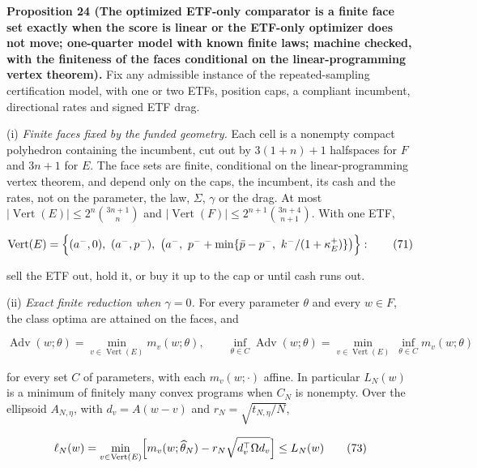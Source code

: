 \documentclass[11pt]{article}
\begin{document}
\label{res:Proposition-24}
\textbf{Proposition 24 (The optimized ETF-only comparator is a finite face set exactly when the score is linear or the ETF-only optimizer does not move; one-quarter model with known finite laws; machine checked, with the finiteness of the faces conditional on the linear-programming vertex theorem).}
Fix any admissible instance of the repeated-sampling certification
model, with one or two ETFs, position caps, a compliant incumbent,
directional rates and signed ETF drag.

(i) \emph{Finite faces fixed by the funded geometry.} Each cell is a
nonempty compact polyhedron containing the incumbent, cut out by
\(3(1+n)+1\) halfspaces for \(F\) and \(3n+1\) for \(E\). The face
sets are finite, conditional on the linear-programming vertex
theorem, and depend only on the caps, the incumbent, its cash
and the rates, not on the parameter, the law, \(\Sigma\), \(\gamma\)
or the drag. At most
\(|\operatorname{Vert}(E)|\leq2^n\binom{3n+1}{n}\) and
\(|\operatorname{Vert}(F)|\leq2^{n+1}\binom{3n+4}{n+1}\). With one
ETF,

\begin{equation*}
\operatorname{Vert}(E)=\Bigl\{(a^-,0),\ (a^-,p^-),\
\bigl(a^-,\ p^-+\min\{\bar p-p^-,\ k^-/(1+\kappa^+_E)\}\bigr)\Bigr\}:\tag{71}\label{eq:71}
\end{equation*}

sell the ETF out, hold it, or buy it up to the cap or until cash
runs out.

(ii) \emph{Exact finite reduction when \(\gamma=0\).} For every parameter
\(\theta\) and every \(w\in F\), the class optima are attained on the
faces, and

\begin{equation*}
\operatorname{Adv}(w;\theta)=\min_{v\in\operatorname{Vert}(E)}m_v(w;\theta),
\qquad
\inf_{\theta\in C}\operatorname{Adv}(w;\theta)
 =\min_{v\in\operatorname{Vert}(E)}\ \inf_{\theta\in C}m_v(w;\theta)\tag{72}\label{eq:72}
\end{equation*}

for every set \(C\) of parameters, with each \(m_v(w;\cdot)\) affine.
In particular \(L_N(w)\) is a minimum of finitely many convex
programs when \(C_N\) is nonempty. Over the ellipsoid \(A_{N,\eta}\),
with \(d_v=A(w-v)\) and \(r_N=\sqrt{t_{N,\eta}/N}\),

\begin{equation*}
\ell_N(w)=\min_{v\in\operatorname{Vert}(E)}
 \Bigl[m_v(w;\widehat\theta_N)-r_N\sqrt{d_v^\top\Omega d_v}\Bigr]
 \leq L_N(w)\tag{73}\label{eq:73}
\end{equation*}
\end{document}
